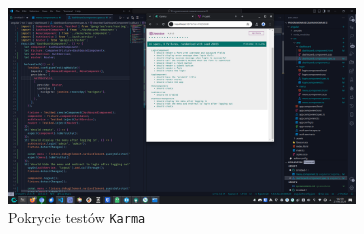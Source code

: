 \documentclass[12pt]{article}
\begin{document}
\begin{figure}[H]
  \centering
  \includegraphics[width=0.82\textwidth,keepaspectratio]{image-18.png}
  \caption{Pokrycie testów \texttt{Karma}}
  \label{fig:image-18}
\end{figure}
\pagebreak
\end{document}
